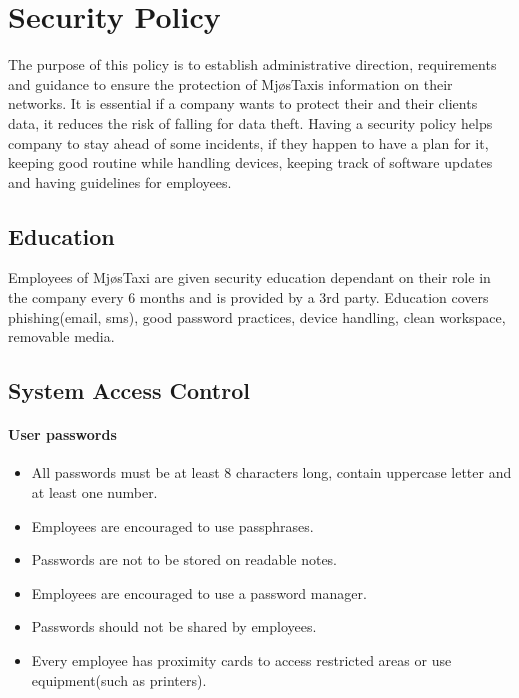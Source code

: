 \chapter{Security Policy}
\label{chap:securityPolicy}


The purpose of this policy is to establish administrative direction, requirements and guidance to ensure the protection of MjøsTaxis information on their networks.
It is essential if a company wants to protect their and their clients data, it reduces the risk of falling for data theft.
Having a security policy helps company to stay ahead of some incidents, if they happen to have a plan for it, keeping good routine while handling devices, keeping track of software updates and having guidelines for employees.

\section{Education}
Employees of MjøsTaxi are given security education dependant on their role in the company every 6 months and is provided by a 3rd party.
Education covers phishing(email, sms), good password practices, device handling, clean workspace, removable media.

\section{System Access Control}
\subsubsection*{User passwords} 
    \begin{itemize}[noitemsep]  %
        \item All passwords must be at least 8 characters long, contain uppercase letter and at least one number.
        \item Employees are encouraged to use passphrases.
        \item Passwords are not to be stored on readable notes.
        \item Employees are encouraged to use a password manager.
        \item Passwords should not be shared by employees.
        \item Every employee has proximity cards to access restricted areas or use equipment(such as printers).
    \end{itemize}{} 

